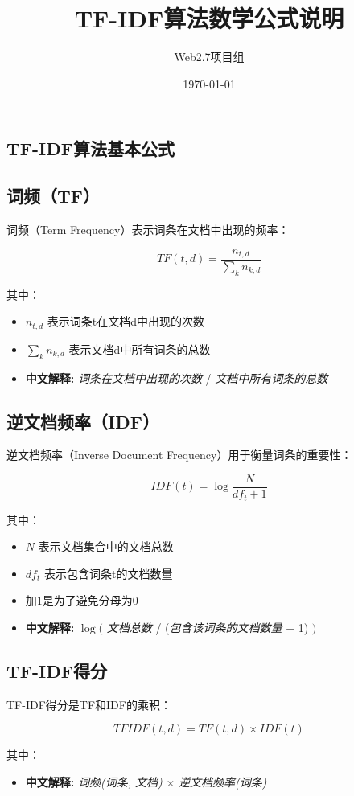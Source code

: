 \documentclass{article}
\title{TF-IDF算法数学公式说明}
\author{Web2.7项目组}
\date{\today}
\begin{document}
\begin{CJK}{UTF8}{gbsn}

\maketitle

\section{TF-IDF算法基本公式}

\subsection{词频（TF）}
词频（Term Frequency）表示词条在文档中出现的频率：

\[
TF(t,d) = \frac{n_{t,d}}{\sum_{k} n_{k,d}}
\]

其中：
\begin{itemize}
\item $n_{t,d}$ 表示词条t在文档d中出现的次数
\item $\sum_{k} n_{k,d}$ 表示文档d中所有词条的总数
\item \textbf{中文解释:} \emph{词条在文档中出现的次数} / \emph{文档中所有词条的总数}
\end{itemize}

\subsection{逆文档频率（IDF）}
逆文档频率（Inverse Document Frequency）用于衡量词条的重要性：

\[
IDF(t) = \log\frac{N}{df_t + 1}
\]

其中：
\begin{itemize}
\item $N$ 表示文档集合中的文档总数
\item $df_t$ 表示包含词条t的文档数量
\item 加1是为了避免分母为0
\item \textbf{中文解释:} $\log($ \emph{文档总数} / (\emph{包含该词条的文档数量} + 1) $)$
\end{itemize}

\subsection{TF-IDF得分}
TF-IDF得分是TF和IDF的乘积：

\[
TFIDF(t,d) = TF(t,d) \times IDF(t)
\]

其中：
\begin{itemize}
\item \textbf{中文解释:} \emph{词频(词条, 文档)} $\times$ \emph{逆文档频率(词条)}
\end{itemize}


\end{CJK}
\end{document}
